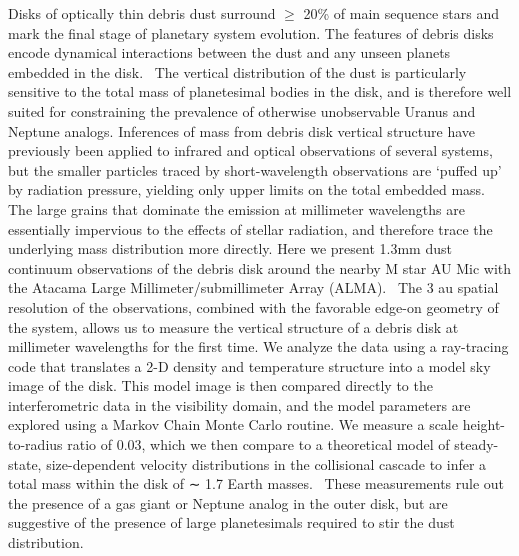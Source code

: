 \documentclass[12 pt, letterpaper]{article}
\begin{document}
\abstract
Disks of optically thin debris dust surround $\geq$ 20\% of main sequence stars and mark the final stage of planetary system evolution. The features of debris disks encode dynamical interactions between the dust and any unseen planets embedded in the disk.  The vertical distribution of the dust is particularly sensitive to the total mass of planetesimal bodies in the disk, and is therefore well suited for constraining the prevalence of otherwise unobservable Uranus and Neptune analogs. Inferences of mass from debris disk vertical structure have previously been applied to infrared and optical observations of several systems, but the smaller particles traced by short-wavelength observations are ‘puffed up’ by radiation pressure, yielding only upper limits on the total embedded mass. The large grains that dominate the emission at millimeter wavelengths are essentially impervious to the effects of stellar radiation, and therefore trace the underlying mass distribution more directly. Here we present 1.3mm dust continuum observations of the debris disk around the nearby M star AU Mic with the Atacama Large Millimeter/submillimeter Array (ALMA).  The 3 au spatial resolution of the observations, combined with the favorable edge-on geometry of the system, allows us to measure the vertical structure of a debris disk at millimeter wavelengths for the first time. We analyze the data using a ray-tracing code that translates a 2-D density and temperature structure into a model sky image of the disk. This model image is then compared directly to the interferometric data in the visibility domain, and the model parameters are explored using a Markov Chain Monte Carlo routine. We measure a scale height-to-radius ratio of 0.03, which we then compare to a theoretical model of steady-state, size-dependent velocity distributions in the collisional cascade to infer a total mass within the disk of ∼ 1.7 Earth masses.  These measurements rule out the presence of a gas giant or Neptune analog in the outer disk, but are suggestive of the presence of large planetesimals required to stir the dust distribution.
\end{document}
